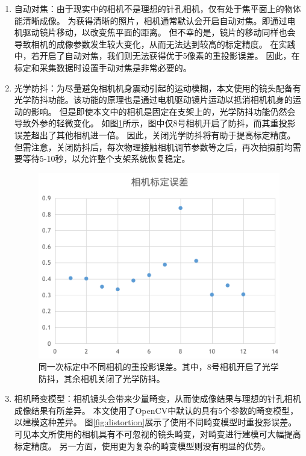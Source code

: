 \begin{enumerate}
\item 自动对焦：由于现实中的相机不是理想的针孔相机，仅有处于焦平面上的物体能清晰成像。
为获得清晰的照片，相机通常默认会开启自动对焦。即通过电机驱动镜片移动，以改变焦平面的距离。
但不幸的是，镜片的移动同样也会导致相机的成像参数发生较大变化，从而无法达到较高的标定精度。
在实践中，若开启了自动对焦，我们则无法获得优于5像素的重投影误差。
因此，在标定和采集数据时设置手动对焦是非常必要的。

\item 光学防抖：为尽量避免相机机身震动引起的运动模糊，本文使用的镜头配备有光学防抖功能。该功能的原理也是通过电机驱动镜片运动以抵消相机机身的运动的影响。
但是即使本文中的相机是固定在支架上的，光学防抖功能仍然会导致外参的轻微变化。
如图\ref{fig:stablize_ablation}所示，图中仅8号相机开启了防抖，而其重投影误差超出了其他相机进一倍。
因此，关闭光学防抖将有助于提高标定精度。但需注意，关闭防抖后，每次物理接触相机调节参数等之后，再次拍摄前均需要等待5-10秒，以允许整个支架系统恢复稳定。

\begin{figure}
    \centering
    \includegraphics[width=0.8\linewidth]{figures/stablize_ablation}
    \caption[不同相机的重投影误差]{同一次标定中不同相机的重投影误差。其中，8号相机开启了光学防抖，其余相机关闭了光学防抖。}
    \label{fig:stablize_ablation}
\end{figure}

\item 相机畸变模型：相机镜头会带来少量畸变，从而使成像结果与理想的针孔相机成像结果有所差异。
本文使用了OpenCV中默认的具有5个参数的畸变模型，以建模这种差异。
图\ref{fig:distortion}展示了使用不同畸变模型时重投影误差。
可见本文所使用的相机具有不可忽视的镜头畸变，对畸变进行建模可大幅提高标定精度。
另一方面，使用更为复杂的畸变模型则没有明显的优势。


\end{enumerate}
